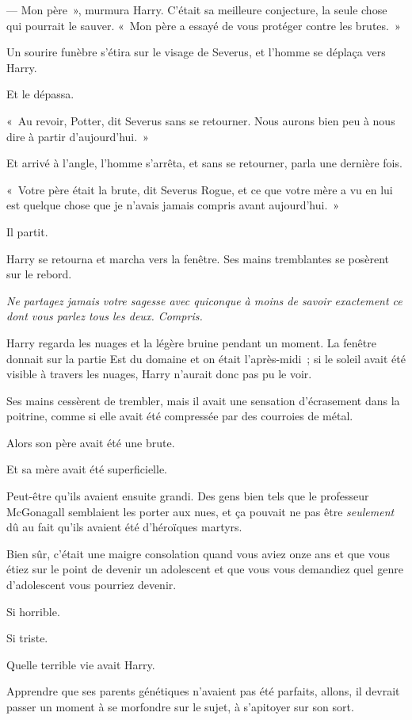 --- Mon père~», murmura Harry. C'était sa meilleure conjecture, la seule chose qui pourrait le sauver. «~Mon père a essayé de vous protéger contre les brutes.~»

Un sourire funèbre s'étira sur le visage de Severus, et l'homme se déplaça vers Harry.

Et le dépassa.

«~Au revoir, Potter, dit Severus sans se retourner. Nous aurons bien peu à nous dire à partir d'aujourd'hui.~»

Et arrivé à l'angle, l'homme s'arrêta, et sans se retourner, parla une dernière fois.

«~Votre père était la brute, dit Severus Rogue, et ce que votre mère a vu en lui est quelque chose que je n'avais jamais compris avant aujourd'hui.~»

Il partit.

Harry se retourna et marcha vers la fenêtre. Ses mains tremblantes se posèrent sur le rebord.

\emph{Ne partagez jamais votre sagesse avec quiconque à moins de savoir exactement ce dont vous parlez tous les deux. Compris.}

Harry regarda les nuages et la légère bruine pendant un moment. La fenêtre donnait sur la partie Est du domaine et on était l'après-midi~; si le soleil avait été visible à travers les nuages, Harry n'aurait donc pas pu le voir.

Ses mains cessèrent de trembler, mais il avait une sensation d'écrasement dans la poitrine, comme si elle avait été compressée par des courroies de métal.

Alors son père avait été une brute.

Et sa mère avait été superficielle.

Peut-être qu'ils avaient ensuite grandi. Des gens bien tels que le professeur McGonagall semblaient les porter aux nues, et ça pouvait ne pas être \emph{seulement} dû au fait qu'ils avaient été d'héroïques martyrs.

Bien sûr, c'était une maigre consolation quand vous aviez onze ans et que vous étiez sur le point de devenir un adolescent et que vous vous demandiez quel genre d'adolescent vous pourriez devenir.

Si horrible.

Si triste.

Quelle terrible vie avait Harry.

Apprendre que ses parents génétiques n'avaient pas été parfaits, allons, il devrait passer un moment à se morfondre sur le sujet, à s'apitoyer sur son sort.

